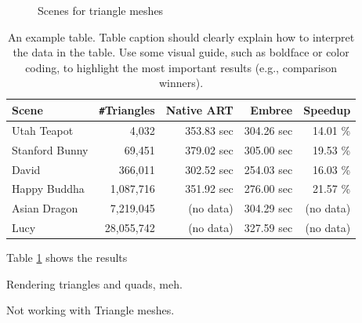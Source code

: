 \begin{figure}
	\hfill
	
	\caption{Scenes for triangle meshes}
	\label{fig:mesh_scenes}
\end{figure}


\begin{table}
	\centering
	{\footnotesize\sf
		\begin{tabular}{lrrrr}
			\toprule
			Scene & \Verb!#!Triangles & Native ART & Embree & Speedup \\ 
			\midrule
			Utah Teapot & 4,032 & 353.83 sec & 304.26 sec & 14.01 \% \\
			Stanford Bunny & 69,451 & 379.02 sec & 305.00 sec & 19.53 \% \\
			David & 366,011 & 302.52 sec & 254.03 sec & 16.03 \%  \\
			\addlinespace %
			Happy Buddha & 1,087,716 & 351.92 sec & 276.00 sec & 21.57 \% \\
			Asian Dragon & 7,219,045 & (no data) & 304.29 sec & (no data)  \\
			Lucy & 28,055,742 & (no data) & 327.59 sec & (no data)  \\
			\bottomrule
	\end{tabular}}
	\caption{An example table. Table caption should clearly explain how to interpret the data in the table. Use some visual guide, such as boldface or color coding, to highlight the most important results (e.g., comparison winners).}
	\label{tab:mesh}
\end{table}

Table \ref{tab:mesh} shows the results




Rendering triangles and quads, meh.

Not working with Triangle meshes.

